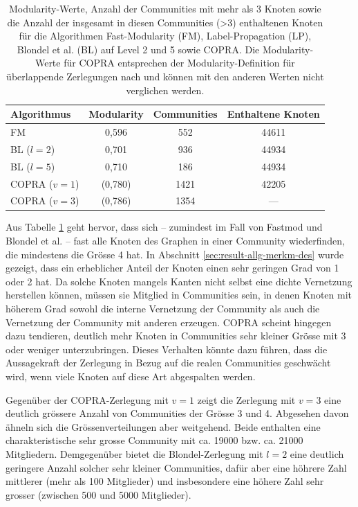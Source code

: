 \begin{table}[t]
  \centering
  \footnotesize
  \begin{tabular}{l|c|c|c}
    Algorithmus & Modularity & Communities &
    Enthaltene Knoten \\
    \hline
    FM & 0,596 & 552 & 44611 \\
    \hline
    BL ($l=2$)& 0,701 & 936 & 44934 \\
    BL ($l=5$)& 0,710 & 186 & 44934 \\
    \hline
    COPRA ($v=1$) & (0,780) & 1421 & 42205 \\
    COPRA ($v=3$) & (0,786) & 1354 & --- \\

  \end{tabular}
  \caption{Modularity-Werte, Anzahl der Communities mit mehr als 3
    Knoten sowie die Anzahl der insgesamt in diesen Communities (>3) enthaltenen
    Knoten 
    f\"ur die Algorithmen Fast-Modularity (FM), Label-Propagation
    (LP), Blondel et al. (BL) auf Level 2 und 5 sowie COPRA. Die
    Modularity-Werte f\"ur COPRA entsprechen der Modularity-Definition
    f\"ur \"uberlappende Zerlegungen nach \cite{Nicosia2009} und k\"onnen mit den anderen
    Werten nicht verglichen werden.}
  \label{tab:mod-result}
\end{table}

Aus Tabelle \ref{tab:mod-result} geht hervor, dass sich -- zumindest
im Fall von Fastmod und Blondel et al. -- fast alle Knoten des Graphen
in einer Community wiederfinden, die mindestens die Gr\"osse 4 hat. In
Abschnitt \ref{sec:result-allg-merkm-des} wurde gezeigt, dass ein
erheblicher Anteil der Knoten einen sehr geringen Grad von 1 oder 2
hat. Da solche Knoten mangels Kanten nicht selbst eine dichte
Vernetzung herstellen k\"onnen, m\"ussen sie Mitglied in Communities
sein, in denen Knoten mit h\"oherem Grad sowohl die interne Vernetzung
der Community als auch die Vernetzung der Community mit anderen
erzeugen. COPRA scheint hingegen dazu tendieren, deutlich mehr Knoten
in Communities sehr kleiner Gr\"osse mit 3 oder weniger
unterzubringen. Dieses Verhalten k\"onnte dazu f\"uhren, dass die
Aussagekraft der Zerlegung in Bezug auf die realen Communities
geschw\"acht wird, wenn viele Knoten auf diese Art abgespalten werden.

Gegen\"uber der COPRA-Zerlegung mit $v=1$ zeigt die Zerlegung mit
$v=3$ eine deutlich gr\"ossere Anzahl von Communities der Gr\"osse 3
und 4. Abgesehen davon \"ahneln sich die Gr\"ossenverteilungen aber
weitgehend. Beide enthalten eine charakteristische sehr grosse
Community mit ca. 19000 bzw. ca. 21000 Mitgliedern. Demgegen\"uber
bietet die Blondel-Zerlegung mit $l=2$ eine deutlich geringere Anzahl
solcher sehr kleiner Communities, daf\"ur aber eine h\"ohrere Zahl
mittlerer (mehr als 100 Mitglieder) und insbesondere eine h\"ohere
Zahl sehr grosser (zwischen 500 und 5000 Mitglieder).

